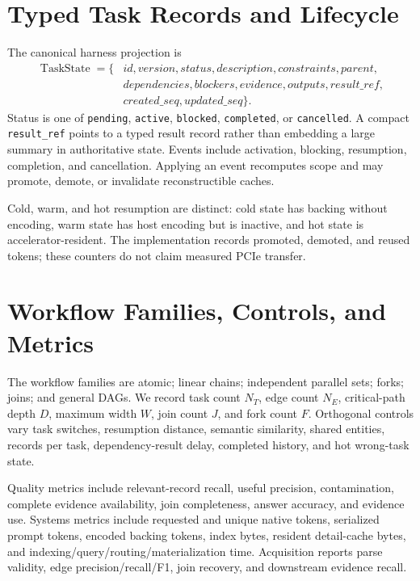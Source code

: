 \documentclass[10pt]{article}
\begin{document}
\appendix

\section{Typed Task Records and Lifecycle}\label{app:records}
The canonical harness projection is
\[
\begin{aligned}
\operatorname{TaskState}=\{&id,version,status,description,constraints,parent,\\
&dependencies,blockers,evidence,outputs,result\_ref,\\
&created\_seq,updated\_seq\}.
\end{aligned}
\]
Status is one of \texttt{pending}, \texttt{active}, \texttt{blocked}, \texttt{completed}, or \texttt{cancelled}. A compact \texttt{result\_ref} points to a typed result record rather than embedding a large summary in authoritative state. Events include activation, blocking, resumption, completion, and cancellation. Applying an event recomputes scope and may promote, demote, or invalidate reconstructible caches.

Cold, warm, and hot resumption are distinct: cold state has backing without encoding, warm state has host encoding but is inactive, and hot state is accelerator-resident. The implementation records promoted, demoted, and reused tokens; these counters do not claim measured PCIe transfer.

\section{Workflow Families, Controls, and Metrics}\label{app:protocol}
The workflow families are atomic; linear chains; independent parallel sets; forks; joins; and general DAGs. We record task count $N_T$, edge count $N_E$, critical-path depth $D$, maximum width $W$, join count $J$, and fork count $F$. Orthogonal controls vary task switches, resumption distance, semantic similarity, shared entities, records per task, dependency-result delay, completed history, and hot wrong-task state.

Quality metrics include relevant-record recall, useful precision, contamination, complete evidence availability, join completeness, answer accuracy, and evidence use. Systems metrics include requested and unique native tokens, serialized prompt tokens, encoded backing tokens, index bytes, resident detail-cache bytes, and indexing/query/routing/materialization time. Acquisition reports parse validity, edge precision/recall/F1, join recovery, and downstream evidence recall.
\end{document}
